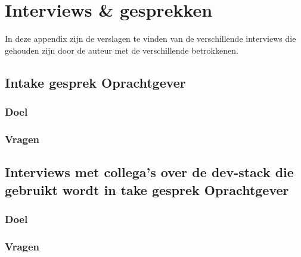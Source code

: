 
\chapter{Interviews \& gesprekken}\label{app:Interviews}

In deze appendix zijn de verslagen te vinden van de verschillende interviews die gehouden zijn door de auteur met de verschillende betrokkenen.
\section{Intake gesprek Oprachtgever}\label{sec:intake-gesprek-oprachtgever}

\subsection{Doel}\label{subsec:intakeDoel}
\lipsum[01]
\subsection{Vragen}\label{subsec:intakeVragen}
\lipsum[01]

\lipsum[01]

\lipsum[01]

\section{Interviews met collega's over de dev-stack die gebruikt wordt in take gesprek Oprachtgever}\label{sec:dev-stackInterviews}


\subsection{Doel}\label{subsec:dev-stackDoel}
\lipsum[01]
\subsection{Vragen}\label{subsec:dev-stackVragen}
\lipsum[01]

\lipsum[01]

\lipsum[01]


